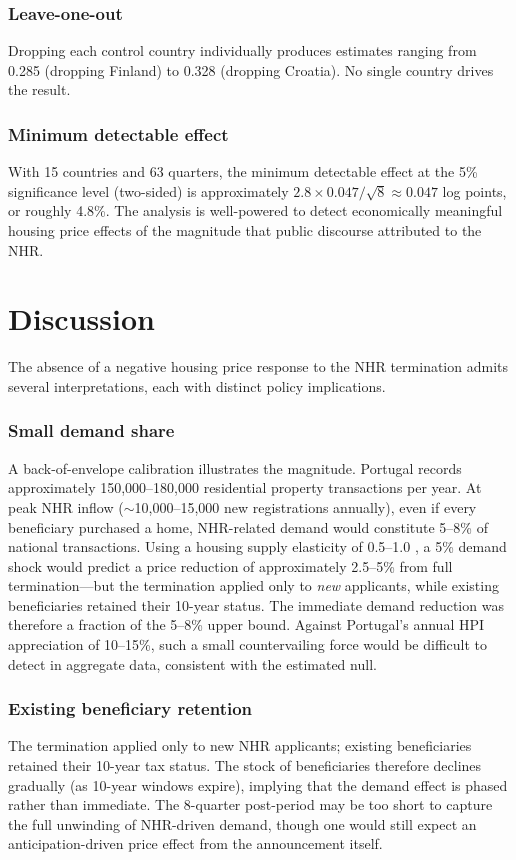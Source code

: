 \documentclass[12pt]{article}
\begin{document}
\subsubsection*{Leave-one-out} Dropping each control country individually produces estimates ranging from 0.285 (dropping Finland) to 0.328 (dropping Croatia). No single country drives the result.

\subsubsection*{Minimum detectable effect} With 15 countries and 63 quarters, the minimum detectable effect at the 5\% significance level (two-sided) is approximately $2.8 \times 0.047 / \sqrt{8} \approx 0.047$ log points, or roughly 4.8\%. The analysis is well-powered to detect economically meaningful housing price effects of the magnitude that public discourse attributed to the NHR.


\section{Discussion}

The absence of a negative housing price response to the NHR termination admits several interpretations, each with distinct policy implications.

\subsubsection*{Small demand share} A back-of-envelope calibration illustrates the magnitude. Portugal records approximately 150,000--180,000 residential property transactions per year. At peak NHR inflow ($\sim$10,000--15,000 new registrations annually), even if every beneficiary purchased a home, NHR-related demand would constitute 5--8\% of national transactions. Using a housing supply elasticity of 0.5--1.0 \citep{saiz2010geographic}, a 5\% demand shock would predict a price reduction of approximately 2.5--5\% from full termination---but the termination applied only to \emph{new} applicants, while existing beneficiaries retained their 10-year status. The immediate demand reduction was therefore a fraction of the 5--8\% upper bound. Against Portugal's annual HPI appreciation of 10--15\%, such a small countervailing force would be difficult to detect in aggregate data, consistent with the estimated null.

\subsubsection*{Existing beneficiary retention} The termination applied only to new NHR applicants; existing beneficiaries retained their 10-year tax status. The stock of beneficiaries therefore declines gradually (as 10-year windows expire), implying that the demand effect is phased rather than immediate. The 8-quarter post-period may be too short to capture the full unwinding of NHR-driven demand, though one would still expect an anticipation-driven price effect from the announcement itself.
\end{document}
